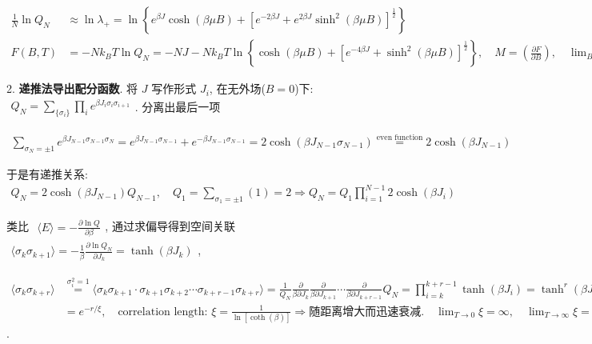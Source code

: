 \documentclass[../../main.tex]{subfiles}
\begin{document}
$\begin{aligned}
    \frac{1}{N}\ln{Q_{N}} &\approx \ln{\lambda_{+}} = \ln{\left\{e^{\beta J}\cosh{(\beta\mu B)} + \left[e^{-2\beta J} + e^{2\beta J}\sinh^{2}{(\beta\mu B)}\right]^{\frac{1}{2}}\right\}}\\
    F(B,T) &= -Nk_{B}T\ln{Q_{N}} = -NJ - Nk_{B}T\ln{\left\{
        \cosh{(\beta\mu B)} + \left[
            e^{-4\beta J} + \sinh^{2}{(\beta\mu B)}
        \right]^{\frac{1}{2}}
    \right\}},\quad M = \left(\frac{\partial F}{\partial B}\right),\quad \lim_{B\rightarrow 0}M = 0
\end{aligned}$

2. \textbf{递推法导出配分函数}. 将 $J$ 写作形式 $J_{i}$, 在无外场($B=0$)下: $\begin{aligned}
    Q_{N} = \sum_{\{\sigma_{i}\}}\prod_{i}e^{\beta J_{i}\sigma_{i}\sigma_{i+1}}
\end{aligned}$. 分离出最后一项 

$\begin{aligned}
    \sum_{\sigma_{N}=\pm 1}e^{\beta J_{N-1}\sigma_{N-1}\sigma_{N}} = e^{\beta J_{N-1}\sigma_{N-1}} + e^{-\beta J_{N-1}\sigma_{N-1}} = 2\cosh{(\beta J_{N-1}\sigma_{N-1})} \stackrel{\text{even function}}{=} 2\cosh{(\beta J_{N-1})}
\end{aligned}$

于是有递推关系: $\begin{aligned}
    Q_{N} = 2\cosh{(\beta J_{N-1})}Q_{N-1},\quad Q_{1} = \sum_{\sigma_{1}=\pm 1}(1) = 2\Rightarrow Q_{N} = Q_{1}\prod_{i=1}^{N-1}2\cosh{(\beta J_{i})}
\end{aligned}$

类比 $\begin{aligned}
    \langle E\rangle = -\frac{\partial\ln{Q}}{\partial\beta}
\end{aligned}$, 通过求偏导得到空间关联 $\begin{aligned}
    \langle\sigma_{k}\sigma_{k+1}\rangle = -\frac{1}{\beta}\frac{\partial\ln{Q_{N}}}{\partial J_{k}} = \tanh{(\beta J_{k})}\end{aligned}$, 
    
    $\begin{aligned}
        \langle\sigma_{k}\sigma_{k+r}\rangle &\stackrel{\sigma_{i}^{2}=1}{=} \langle \sigma_{k}\sigma_{k+1}\cdot \sigma_{k+1}\sigma_{k+2}\cdots \sigma_{k+r-1}\sigma_{k+r}\rangle
    = \frac{1}{Q_{N}}\frac{\partial}{\beta\partial J_{k}}\frac{\partial}{\beta\partial J_{k+1}} \cdots \frac{\partial}{\beta\partial J_{k+r-1}}Q_{N}
    = \prod _{i=k}^{k+r-1}\tanh{(\beta J_{i})} = \tanh^{r}{(\beta J)}\\
    &= e^{-r/\xi},\quad \text{correlation length: }\xi = \frac{1}{\ln{[\coth{(\beta)}]}}\Rightarrow\text{随距离增大而迅速衰减}.\quad \lim_{T\rightarrow 0}\xi = \infty,\quad \lim_{T\rightarrow\infty}\xi = 0
\end{aligned}$. 
\end{document}
